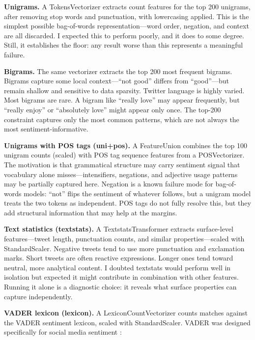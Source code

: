 \documentclass[12pt]{article}
\begin{document}
\textbf{Unigrams.} A TokensVectorizer extracts count features for the top 200 unigrams, after removing stop words and punctuation, with lowercasing applied. This is the simplest possible bag-of-words representation---word order, negation, and context are all discarded. I expected this to perform poorly, and it does to some degree. Still, it establishes the floor: any result worse than this represents a meaningful failure.

\textbf{Bigrams.} The same vectorizer extracts the top 200 most frequent bigrams. Bigrams capture some local context---``not good'' differs from ``good''---but remain shallow and sensitive to data sparsity. Twitter language is highly varied. Most bigrams are rare. A bigram like ``really love'' may appear frequently, but ``really enjoy'' or ``absolutely love'' might appear only once. The top-200 constraint captures only the most common patterns, which are not always the most sentiment-informative.

\textbf{Unigrams with POS tags (uni+pos).} A FeatureUnion combines the top 100 unigram counts (scaled) with POS tag sequence features from a POSVectorizer. The motivation is that grammatical structure may carry sentiment signal that vocabulary alone misses---intensifiers, negations, and adjective usage patterns may be partially captured here. Negation is a known failure mode for bag-of-words models: ``not'' flips the sentiment of whatever follows, but a unigram model treats the two tokens as independent. POS tags do not fully resolve this, but they add structural information that may help at the margins.

\textbf{Text statistics (textstats).} A TextstatsTransformer extracts surface-level features---tweet length, punctuation counts, and similar properties---scaled with StandardScaler. Negative tweets tend to use more punctuation and exclamation marks. Short tweets are often reactive expressions. Longer ones tend toward neutral, more analytical content. I doubted textstats would perform well in isolation but expected it might contribute in combination with other features. Running it alone is a diagnostic choice: it reveals what surface properties can capture independently.

\textbf{VADER lexicon (lexicon).} A LexiconCountVectorizer counts matches against the VADER sentiment lexicon, scaled with StandardScaler. VADER was designed specifically for social media sentiment \citep{hutto2014vader}:
\end{document}
